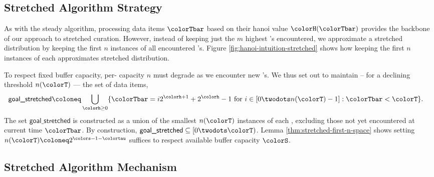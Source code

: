 
\subsection{Stretched Algorithm Strategy}
\label{sec:stretched-strategy}

As with the steady algorithm, processing data items $\colorTbar$ based on their hanoi value $\colorH(\colorTbar)$ provides the backbone of our approach to stretched curation.
However, instead of keeping just the $m$ highest \hv{}'s encountered, we approximate a stretched distribution by keeping the first $n$ instances of all encountered \hv{}'s.
Figure \ref{fig:hanoi-intuition-stretched} shows how keeping the first $n$ instances of each \hv{} approximates stretched distribution.

To respect fixed buffer capacity, per-\hv{} capacity $n$ must degrade as we encounter new \hv{}'s.
We thus set out to maintain -- for a declining threshold $n(\colorT)$ --- the set of data items,
\begin{align*}
\textsf{goal\_stretched}
&\coloneq
\bigcup_{\colorh \geq 0}
\{ \colorTbar = i2^{\colorh + 1} + 2^{\colorh} - 1 \text{ for } i \in [0 \twodots n(\colorT) - 1] : \colorTbar < \colorT \}.
\end{align*}
The set $\textsf{goal\_stretched}$ is constructed as a union of the smallest $n(\colorT)$ instances of each \hv{}, excluding those not yet encountered at current time $\colorTbar$.
By construction, $\textsf{goal\_stretched} \subseteq [0 \twodots \colorT)$.
Lemma \ref{thm:stretched-first-n-space} shows setting $n(\colorT) \coloneq 2^{\colors - 1 - \colortau}$ suffices to respect available buffer capacity $\colorS$.


\FloatBarrier  %


\subsection{Stretched Algorithm Mechanism}
\label{sec:stretched-mechanism}

